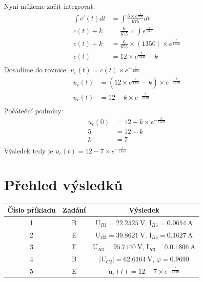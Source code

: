 \documentclass[a4paper, 10pt, fleqn]{article}
\begin{document}
Nyní můžeme začít integrovat: \\
\begin{align*}
 \int{c'(t)}dt &= \int\frac{6 \times e^{\frac{t}{1350}}}{675} dt \\
 c(t) + k &= \frac{6}{675} \times \int e^{\frac{t}{1350}} \\
 c(t) + k &= \frac{6}{675} \times (1350) \times e^{\frac{t}{1350}} \\
 c(t) &= 12 \times e^{\frac{t}{1350}} - k \\
\end{align*}
Dosadíme do rovnice: $u_{c}(t) = c(t) \times e^{-\frac{t}{1350}}$ \\
\begin{align*}
 u_{c}(t) &= (12 \times e^{\frac{t}{1350}} - k ) \times e^{-\frac{t}{1350}} \\
 u_{c}(t) &= 12  - k \times e^{-\frac{t}{1350}} \\
\end{align*}
Počáteční podmíny:
\begin{align*}
 u_{c}(0) &= 12  - k \times e^{-\frac{0}{1350}} \\
 5 &= 12  - k \\
 k &= 7 \\
\end{align*}
Výsledek tedy je $u_{c}(t) = 12  - 7 \times e^{-\frac{t}{1350}}$
\newpage
\section*{Přehled výsledků}
\begin{center}
  \begin{tabular}{ | c | c | c |}
    \hline
    Číslo příkladu & Zadání & Výsledek \\ \hline
    1 & B & U$_{R3} = 22.2525~$V,  I$_{R3} = 0.0654~$A \\ \hline
    2 & E & U$_{R3} = 39.8621~$V, I$_{R3} = 0.1627~$A \\ \hline
    3 & F & U$_{R3} = 95.7140~$V, I$_{R3} = 0.0.1806~$A \\ \hline
    4 & B & $|$U$_{C2}| = 62.6164~$V, $\varphi = 0.9690$\\ \hline
    5 & E & u$_{c}(t) = 12 - 7 \times e^{-\frac{t}{1350}}$ \\ \hline
  \end{tabular}
\end{center}
\end{document}
